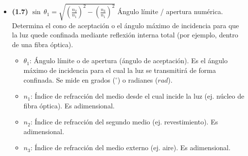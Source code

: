 \documentclass{article}
\begin{document}
\begin{itemize}
				\item \textbf{(1.7)} $\boxed{\sin\,\theta_{1}=\sqrt{(\frac{n_{2}}{n_{1}})^{2}-(\frac{n_{3}}{n_{1}})^{2}}}$ Ángulo límite / apertura numérica. Determina el cono de aceptación o el ángulo máximo de incidencia para que la luz quede confinada mediante reflexión interna total (por ejemplo, dentro de una fibra óptica).
					\begin{itemize}
						\item $\theta_1$: Ángulo límite o de apertura (ángulo de aceptación). Es el ángulo máximo de incidencia para el cual la luz se transmitirá de forma confinada. Se mide en grados ($^\circ$) o radianes ($rad$).
						\item $n_1$: Índice de refracción del medio desde el cual incide la luz (ej. núcleo de fibra óptica). Es adimensional.
						\item $n_2$: Índice de refracción del segundo medio (ej. revestimiento). Es adimensional.
						\item $n_3$: Índice de refracción del medio externo (ej. aire). Es adimensional.
					\end{itemize}
			\end{itemize}
\end{document}
